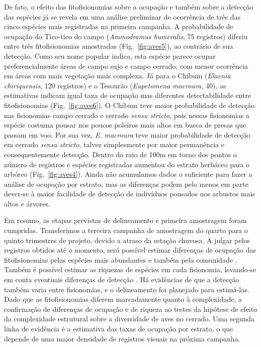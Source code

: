 De fato, o efeito das fitofisionomias sobre a ocupação e também sobre
a detecção das espécies já se revela em uma análise preliminar
de ocorrência de três das cinco espécies mais registradas na
primeira campanha. A probabilidade de ocupação do  Tico-tico 
do campo  (\textit{Ammodramus humeralis}, 75 registros) 
diferiu entre três fitofisionomias amostradas
(Fig.~\ref{fig:aves5}), ao contrário de sua detecção. 
Como seu nome popular indica, esta espécie parece ocupar
preferencialmente áreas de campo sujo e campo cerrado, com menor
ocorrência em áreas com mais vegetação mais complexa. Já para o Chibum
(\textit{Elaenia chiriquensis}, 120 registros) e o Tesourão (\textit{Eupetomena
macroura}, 40), as estimativas indicam igual taxa de ocupação mas diferentes 
detectabilidade entre fitofisionomias 
(Fig.~\ref{fig:aves6}). O Chibum teve maior
probabilidade de detecção nas fisionomias campo cerrado e cerrado
\textit{sensu stricto}, pois nessas fisionomias a espécie costuma pousar nos poucos 
poleiros mais altos em busca de presas que passam em voo. Por sua vez,
\textit{E. macroura} teve maior probabilidade de detecção em cerrado
\textit{sensu stricto}, talvez simplesmente por
maior permanência e consequentemente detecção.
Dentro do raio de 100m em torno dos pontos o número de registros e 
espécies registradas  aumentou
do estrato herbáceo para o arbóreo (Fig.~\ref{fig:aves4}).  
Ainda não acumulamos 
dados o suficiente para fazer a análise de ocupação
por estrato, mas as diferenças podem pelo menos em parte dever-se 
à maior facilidade de detecção de indivíduos pousados
nos arbustos mais altos e árvores. 

Em resumo, as etapas previstas de delineamento e primeira amostragem
foram cumpridas. Transferimos a terceira campanha de amostragem do quarto para o
quinto trimestres de projeto, devido a atraso da estação chuvosa. 
A julgar pelos registros obtidos até o momento,
será possível estimar diferenças de ocupação das fitofisionomias
pelas espécies mais abundantes e também pela comunidade \cite{dorazio2005}.
Também é possível estimar as riquezas de espécies
em cada fisionomia, levando-se em conta eventuais diferenças de detecção \cite{dorazio2006}.
Há evidências de que a detecção também varia entre fisionomias,
e o delineamento foi planejado para estimá-las.
Dado que as fitofisionomias diferem marcadamente quanto à complexidade,
a confirmação de diferenças de ocupação e de riqueza ao testes
da hipótese de efeito da complexidade estrutural sobre a diversidade
de aves no cerrado. Uma segunda linha de evidência é a estimativa das
taxas de ocupação por estrato, o que depende de uma maior densidade de 
registros visuais na próxima campanha.

